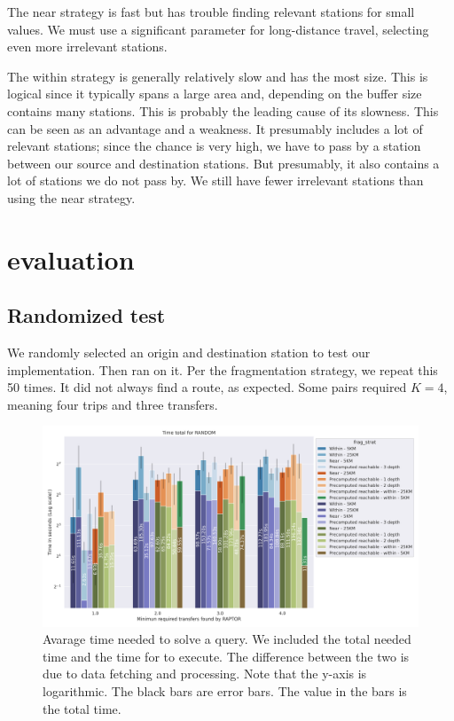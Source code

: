 The near strategy is fast but has trouble finding relevant stations for small values. We must use a significant parameter for long-distance travel, selecting even more irrelevant stations. 

The within strategy is generally relatively slow and has the most size. This is logical since it typically spans a large area and, depending on the buffer size contains many stations. This is probably the leading cause of its slowness. This can be seen as an advantage and a weakness. It presumably includes a lot of relevant stations; since the chance is very high, we have to pass by a station between our source and destination stations. But presumably, it also contains a lot of stations we do not pass by. We still have fewer irrelevant stations than using the near strategy. 

\section{ evaluation}\label{sec:raptor:eval}
\subsection{Randomized  test}
We randomly selected an origin and destination station to test our implementation. Then ran  on it. Per the fragmentation strategy, we repeat this 50 times. It did not always find a route, as expected. Some pairs required $K=4$, meaning four trips and three transfers. 

\begin{figure}[H]
    \centering
    \includegraphics[width=\textwidth]{images/random_timestacked(2).png}
    \caption{Avarage time needed to solve a query. We included the total needed time and the time for  to execute. The difference between the two is due to data fetching and processing. Note that the y-axis is logarithmic. The black bars are error bars. The value in the bars is the total time.}
    \label{fig:random:timstacked}
\end{figure}

